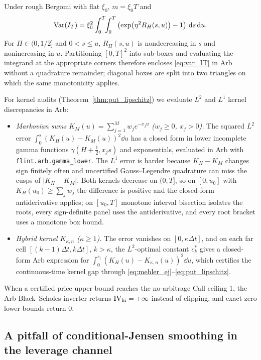 Under rough Bergomi with flat $\xi_0$, $m=\xi_0 T$ and
\begin{equation}
  \operatorname{Var}(I_T) = \xi_0^2\int_0^T\!\!\int_0^T \left(\exp\!\left(\eta^2 R_H(s,u)\right) - 1\right)\,\mathrm{d} s\,\mathrm{d} u.
  \label{eq:var_IT}
\end{equation}
For $H\in(0,1/2]$ and $0<s\le u$, $R_H(s,u)$ is nondecreasing in $s$ and nonincreasing in $u$. Partitioning $[0,T]^2$ into sub-boxes and evaluating the integrand at the appropriate corners therefore encloses \eqref{eq:var_IT} in Arb without a quadrature remainder; diagonal boxes are split into two triangles on which the same monotonicity applies.

For kernel audits (Theorem~\ref{thm:put_lipschitz}) we evaluate $L^2$ and $L^1$ kernel discrepancies in Arb:
\begin{itemize}
  \item \emph{Markovian sums $K_M(u)=\sum_{j=1}^M w_j e^{-x_j u}$ ($w_j\ge0$, $x_j>0$).} The squared $L^2$ error $\int_0^s (K_H(u)-K_M(u))^2\dd u$ has a closed form in lower incomplete gamma functions $\gamma(H+\tfrac12,x_j s)$ and exponentials, evaluated in Arb with \texttt{flint.arb.gamma\_lower}. The $L^1$ error is harder because $K_H-K_M$ changes sign finitely often and uncertified Gauss--Legendre quadrature can miss the cusps of $|K_H-K_M|$. Both kernels decrease on $(0,T]$, so on $[0,u_0]$ with $K_H(u_0)\ge\sum_j w_j$ the difference is positive and the closed-form antiderivative applies; on $[u_0,T]$ monotone interval bisection isolates the roots, every sign-definite panel uses the antiderivative, and every root bracket uses a monotone box bound.
  \item \emph{Hybrid kernel $K_{\kappa,n}$ ($\kappa\ge 1$).} The error vanishes on $[0,\kappa\Delta t]$, and on each far cell $[(k-1)\Delta t,k\Delta t]$, $k>\kappa$, the $L^2$-optimal constant $c_k^*$ gives a closed-form Arb expression for $\int_0^{s_i}(K_H(u)-K_{\kappa,n}(u))^2\dd u$, which certifies the continuous-time kernel gap through \eqref{eq:mehler_ej}--\eqref{eq:put_lipschitz}.
\end{itemize}
When a certified price upper bound reaches the no-arbitrage Call ceiling $1$, the Arb Black--Scholes inverter returns $\mathrm{IV}_{\mathrm{hi}}=+\infty$ instead of clipping, and exact zero lower bounds return $0$.

\subsection{A pitfall of conditional-Jensen smoothing in the leverage channel}
\label{sec:jensen_pitfall}


